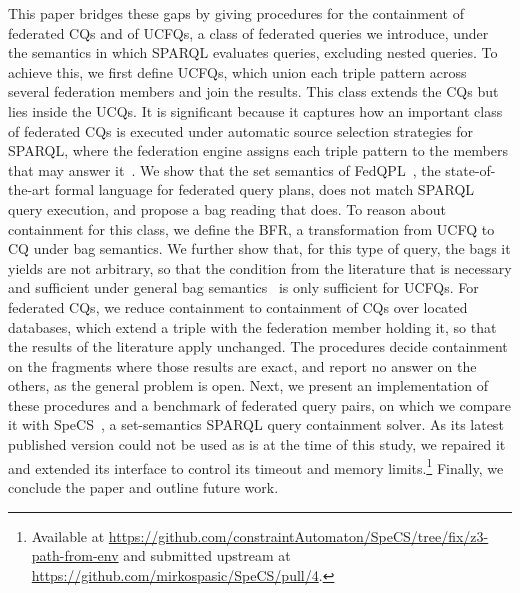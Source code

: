This paper bridges these gaps by giving procedures for the containment of federated \acp{CQ} and of \acp{UCFQ}, a class of federated queries we introduce, under the semantics in which SPARQL evaluates queries, excluding nested queries.
To achieve this, we first define \acp{UCFQ}, which union each triple pattern across several federation members and join the results.
This class extends the \acp{CQ} but lies inside the \acp{UCQ}.
It is significant because it captures how an important class of federated \acp{CQ} is executed under automatic source selection strategies for SPARQL, where the federation engine assigns each triple pattern to the members that may answer it~\cite{Cheng2021}.
We show that the set semantics of FedQPL~\cite{Cheng2021}, the state-of-the-art formal language for federated query plans, does not match SPARQL query execution, and propose a bag reading that does.
To reason about containment for this class, we define the \ac{BFR}, a transformation from \ac{UCFQ} to \ac{CQ} under bag semantics.
We further show that, for this type of query, the bags it yields are not arbitrary, so that the condition from the literature that is necessary and sufficient under general bag semantics~\cite{Afrati2010} is only sufficient for \acp{UCFQ}.
For federated \acp{CQ}, we reduce containment to containment of \acp{CQ} over located databases, which extend a triple with the federation member holding it, so that the results of the literature apply unchanged.
The procedures decide containment on the fragments where those results are exact, and report no answer on the others, as the general problem is open.
Next, we present an implementation of these procedures and a benchmark of federated query pairs,
on which we compare it with SpeCS~\cite{Spasic2023}, a set-semantics SPARQL query containment solver.
As its latest published version could not be used as is at the time of this study, we repaired it and extended its interface to control its timeout and memory limits.\footnote{\label{fn_specs}Available at \url{https://github.com/constraintAutomaton/SpeCS/tree/fix/z3-path-from-env} and submitted upstream at \url{https://github.com/mirkospasic/SpeCS/pull/4}.}
Finally, we conclude the paper and outline future work.
